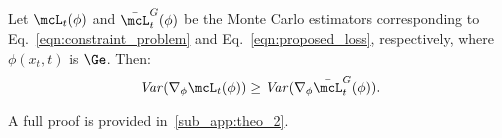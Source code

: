 \begin{tcolorbox}[title=Variance Reduction of the Proposed Loss]
\begin{theorem}
Let \(\mcL_t(\phi)\) and \(\bar{\mcL}_t^G(\phi)\) be the Monte Carlo estimators corresponding to Eq.~\eqref{eqn:constraint_problem} and Eq.~\eqref{eqn:proposed_loss}, respectively, where \(\phi(x_t, t)\) is \(\Ge\). Then:
\begin{equation}
    \text{\emph{Var}}(\nabla_\phi \mcL_t(\phi)) \geq \text{\emph{Var}}(\nabla_\phi \bar{\mcL}_t^G(\phi)).
\end{equation}
\label{the:theo_2}
\end{theorem}
\end{tcolorbox}


A full proof is provided in~\cref{sub_app:theo_2}.

